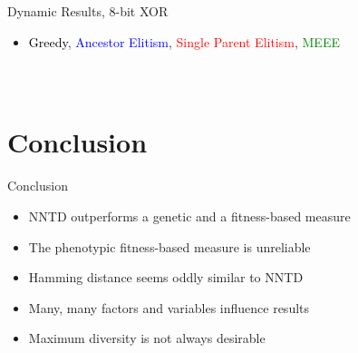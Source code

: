 \begin{frame}[t]{Dynamic Results, 8-bit XOR}
  \begin{itemize}
    \item \textcolor{black}{Greedy}, \textcolor{blue}{Ancestor Elitism}, \textcolor{red}{Single Parent Elitism}, \textcolor{green}{MEEE}
  \end{itemize}

  \begin{columns}[T]
    \begin{figure}
      \centering
      \batchmode
      \scrollmode
    \end{figure}
    \vfill
    \begin{figure}
      \centering
      \batchmode
      \scrollmode
    \end{figure}
    \begin{figure}
      \centering
      \batchmode
      \scrollmode
    \end{figure}
    \begin{figure}
      \centering
      \batchmode
      \scrollmode
    \end{figure}
  \end{columns}

\end{frame}

\section{Conclusion}
\begin{frame}{Conclusion}
  \begin{itemize}
    \item NNTD outperforms a genetic and a fitness-based measure
    \item The phenotypic fitness-based measure is unreliable
    \item Hamming distance seems oddly similar to NNTD
    \item Many, many factors and variables influence results
    \item Maximum diversity is not always desirable
  \end{itemize}
\end{frame}

